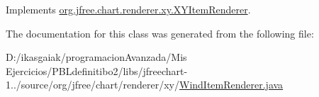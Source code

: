 Implements \mbox{\hyperlink{interfaceorg_1_1jfree_1_1chart_1_1renderer_1_1xy_1_1_x_y_item_renderer_ad867040a3ea09f5127596aacdd94586a}{org.\+jfree.\+chart.\+renderer.\+xy.\+X\+Y\+Item\+Renderer}}.



The documentation for this class was generated from the following file\+:\begin{DoxyCompactItemize}
\item 
D\+:/ikasgaiak/programacion\+Avanzada/\+Mis Ejercicios/\+P\+B\+Ldefinitibo2/libs/jfreechart-\/1../source/org/jfree/chart/renderer/xy/\mbox{\hyperlink{_wind_item_renderer_8java}{Wind\+Item\+Renderer.\+java}}\end{DoxyCompactItemize}
